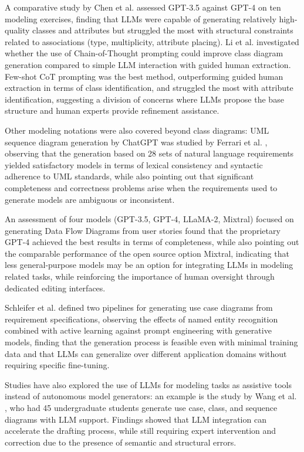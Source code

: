 {{A comparative study by Chen et al. \cite{chen2023automated} assessed GPT-3.5 against GPT-4 on ten modeling exercises, finding that LLMs were capable of generating relatively high-quality classes and attributes but struggled the most with structural constraints related to associations (type, multiplicity, attribute placing). Li et al. \cite{li2024llm} investigated whether the use of Chain-of-Thought prompting could improve class diagram generation compared to simple LLM interaction with guided human extraction. Few-shot CoT prompting was the best method, outperforming guided human extraction in terms of class identification, and struggled the most with attribute identification, suggesting a division of concerns where LLMs propose the base structure and human experts provide refinement assistance. 

Other modeling notations were also covered beyond class diagrams: UML sequence diagram generation by ChatGPT was studied by Ferrari et al. \cite{ferrari2024model}, observing that the generation based on 28 sets of natural language requirements yielded satisfactory models in terms of lexical consistency and syntactic adherence to UML standards, while also pointing out that significant completeness and correctness problems arise when the requirements used to generate models are ambiguous or inconsistent. 

An assessment of four models (GPT-3.5, GPT-4, LLaMA-2, Mixtral) focused on generating Data Flow Diagrams from user stories \cite{herwanto2024automating} found that the proprietary GPT-4 achieved the best results in terms of completeness, while also pointing out the comparable performance of the open source option Mixtral, indicating that less general-purpose models may be an option for integrating LLMs in modeling related tasks, while reinforcing the importance of human oversight through dedicated editing interfaces.

Schleifer et al. \cite{schleifer2024minimal} defined two pipelines for generating use case diagrams from requirement specifications, observing the effects of named entity recognition combined with active learning against prompt engineering with generative models, finding that the generation process is feasible even with minimal training data and that LLMs can generalize over different application domains without requiring specific fine-tuning.

Studies have also explored the use of LLMs for modeling tasks as assistive tools instead of autonomous model generators: an example is the study by Wang et al. \cite{wang2024llms}, who had 45 undergraduate students generate use case, class, and sequence diagrams with LLM support. Findings showed that LLM integration can accelerate the drafting process, while still requiring expert intervention and correction due to the presence of semantic and structural errors.

}}
